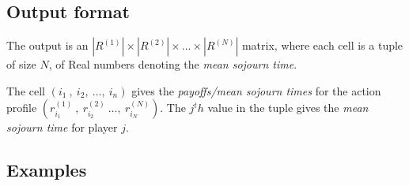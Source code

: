 \subsection{Output format}
The output is an $|R^{(1)}| \times |R^{(2)}| \times ... \times |R^{(N)}|$ matrix, where each cell is a tuple of size $N$, of Real numbers denoting the \textit{mean sojourn time}.
\begin{remark}
The cell $(i_1 ~ , ~ i_2, ~ \ldots , ~ i_n)$ gives the \textit{payoffs/mean sojourn times} for the action profile $(r_{i_1}^{(1)} ~ , ~ r_{i_2}^{(2)} ~ \ldots , ~ r_{i_N}^{(N)})$. The $j^th$ value in the tuple gives the \textit{mean sojourn time} for player $j$.
\end{remark}


\subsection{Examples}
